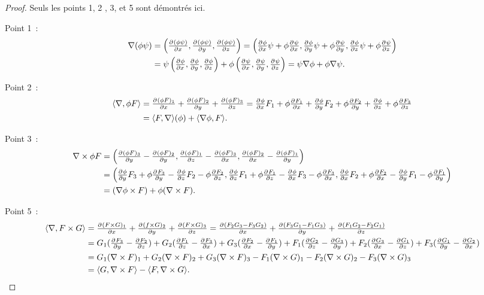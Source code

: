 \documentclass{article}
\newcommand{\scpr}[2]{{\left\langle#1, #2\right\rangle}}
\newcommand{\divg}[1]{\scpr \nabla {#1}}
\newcommand{\rot}[1]{\nabla \times #1}
\theoremstyle{definition}
\theoremstyle{remark}
\begin{document}
		\begin{proof} Seuls les points 1, 2 , 3, et 5 sont démontrés ici.

		Point 1~:
		\begin{align*}
			\nabla(\phi\psi) &= \left(\pd {(\phi\psi)}x, \pd {(\phi\psi)}y, \pd {(\phi\psi)}z\right)
				= \left(\pd \phi x\psi + \phi \pd \psi x, \pd \phi y\psi + \phi\pd \psi y, \pd \phi z\psi + \phi\pd \psi z\right) \\
			&= \psi\left(\pd \phi x, \pd \phi y, \pd \phi z\right) + \phi\left(\pd \psi x, \pd \psi y, \pd \psi z\right)
				= \psi\nabla\phi + \phi\nabla\psi.
		\end{align*}

		Point 2~:
		\begin{align*}
			\divg {\phi F} &= \pd {(\phi F)_1}x + \pd {(\phi F)_2}y + \pd {(\phi F)_3}z
				= \pd \phi xF_1 + \phi\pd {F_1}x + \pd \phi yF_2 + \phi\pd {F_2}y + \pd \phi z + \phi\pd {F_3}z \\
			&= \scpr F{\nabla}(\phi) + \scpr {\nabla \phi}F.
		\end{align*}

		Point 3~:
		\begin{align*}
			\rot {\phi F} &= \left(\pd {(\phi F)_3}y - \pd {(\phi F)_2}y, \pd {(\phi F)_1}z - \pd {(\phi F)_3}x, \pd {(\phi F)_2}x - \pd {(\phi F)_1}y\right) \\
			&= \left(
					\pd \phi yF_3 + \phi \pd {F_3}y - \pd \phi zF_2 - \phi \pd {F_2}z,
					\pd \phi zF_1 + \phi \pd {F_1}z - \pd \phi xF_3 - \phi \pd {F_3}x,
					\pd \phi xF_2 + \phi \pd {F_2}x - \pd \phi yF_1 - \phi \pd {F_1}y
				\right) \\
			&= (\nabla \phi \times F) + \phi(\rot F).
		\end{align*}

		Point 5~:
		\begin{align*}
			\divg {F \times G} &= \pd {(F \times G)_1}x + \pd {(f \times G)_2}y + \pd {(F \times G)_3}z
				= \pd {(F_2G_3 - F_3G_2)}x + \pd {(F_3G_1 - F_1G_3)}y + \pd {(F_1G_2 - F_2G_1)}z \\
			&= G_1(\pd {F_3}y - \pd {F_2}z) + G_2(\pd {F_1}z - \pd {F_3}x) + G_3(\pd {F_2}x - \pd {F_1}y)
			 + F_1(\pd {G_2}z - \pd {G_3}y) + F_2(\pd {G_3}x - \pd {G_1}z) + F_3(\pd {G_1}y - \pd {G_2}x) \\
			&= G_1(\rot F)_1 + G_2(\rot F)_2 + G_3(\rot F)_3 - F_1(\rot G)_1 - F_2(\rot G)_2 - F_3(\rot G)_3 \\
			&= \scpr G{\rot F} - \scpr F{\rot G}.
		\end{align*}
		\end{proof}
\end{document}
